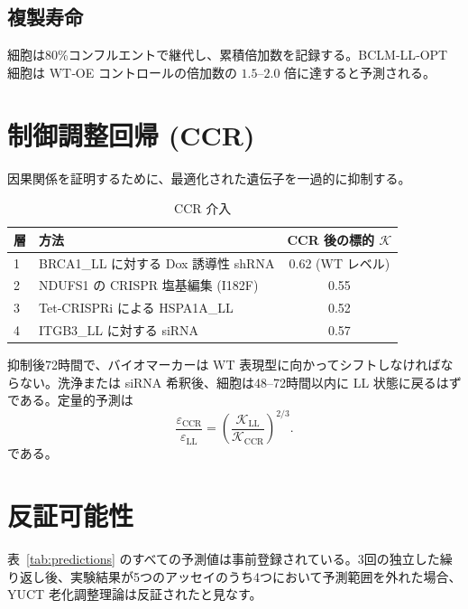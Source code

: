 \documentclass[12pt,a4paper]{ltjsarticle}
\newcommand{\REL}{\mathcal{K}}          %
\begin{document}
	\subsection{複製寿命}
	細胞は80\%コンフルエントで継代し、累積倍加数を記録する。BCLM‑LL‑OPT 細胞は WT‑OE コントロールの倍加数の \(1.5\)–\(2.0\) 倍に達すると予測される。
	
	\section{制御調整回帰 (CCR)}
	\label{sec:CCR}
	因果関係を証明するために、最適化された遺伝子を一過的に抑制する。
	
	\begin{table}[H]
		\centering
		\caption{CCR 介入}
		\label{tab:CCR}
		\begin{tabular}{@{}llc@{}}
			\toprule
			\textbf{層} & \textbf{方法} & \textbf{CCR 後の標的 \(\REL\)} \\
			\midrule
			1 & BRCA1\_LL に対する Dox 誘導性 shRNA & 0.62 (WT レベル) \\
			2 & NDUFS1 の CRISPR 塩基編集 (I182F)   & 0.55 \\
			3 & Tet‑CRISPRi による HSPA1A\_LL       & 0.52 \\
			4 & ITGB3\_LL に対する siRNA            & 0.57 \\
			\bottomrule
		\end{tabular}
	\end{table}
	
	抑制後72時間で、バイオマーカーは WT 表現型に向かってシフトしなければならない。洗浄または siRNA 希釈後、細胞は48–72時間以内に LL 状態に戻るはずである。定量的予測は
	\[
	\frac{\varepsilon_{\mathrm{CCR}}}{\varepsilon_{\mathrm{LL}}} = \left(\frac{\REL_{\mathrm{LL}}}{\REL_{\mathrm{CCR}}}\right)^{2/3}.
	\]
	である。
	
	\section{反証可能性}
	\label{sec:falsifiability}
	表~\ref{tab:predictions} のすべての予測値は事前登録されている。3回の独立した繰り返し後、実験結果が5つのアッセイのうち4つにおいて予測範囲を外れた場合、YUCT 老化調整理論は反証されたと見なす。
	
\end{document}
